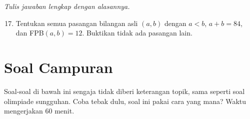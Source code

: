 \documentclass[11pt,a4paper]{article}
\begin{document}
\textit{Tulis jawaban lengkap dengan alasannya.}
\begin{enumerate}
    \setcounter{enumi}{16}
    \item Tentukan semua pasangan bilangan asli $(a, b)$ dengan $a < b$, $a + b = 84$, dan
          FPB$(a, b) = 12$. Buktikan tidak ada pasangan lain.
\end{enumerate}

\newpage
\section*{Soal Campuran}

Soal-soal di bawah ini sengaja tidak diberi keterangan topik, sama seperti soal olimpiade
sungguhan. Coba tebak dulu, soal ini pakai cara yang mana? Waktu mengerjakan 60 menit.
\end{document}

